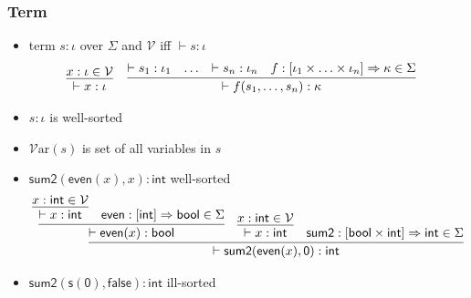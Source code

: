 \documentclass[12pt,aspectratio=169]{beamer}
\newcommand{\m}[1]{\mathsf{#1}}
\newcommand{\VV}{\mathcal{V}}
\newcommand{\TT}{\mathcal{T}}
\newcommand{\Var}{\mathcal{V}\mathrm{ar}}
\newcommand{\Terms}{\TT\mathrm{erms}}
\begin{document}
\begin{frame}
    \frametitle{Term}
    \begin{definition}[term]
        \begin{itemize}
        \item \alert{term} $s : \iota$ over $\Sigma$ and $\VV$ iff
        $\vdash s : \iota$ \pause
        \begin{align*}
            \infer{\vdash x : \iota}{x : \iota \in \VV} \;\;\;\;
                & \infer{\vdash f(s_1,\ldots, s_n) : \kappa}
                    {\vdash s_1 : \iota_1 & \ldots & \vdash s_n : \iota_n
                    & f:[\iota_1 \times \ldots \times \iota_n]
                    \Rightarrow \kappa \in \Sigma}
        \end{align*}
        \pause
        \item $s : \iota$ is \alert{well-sorted}
        \pause
        \item \alert{$\Var(s)$} is set of all variables in $s$
        \end{itemize}
    \end{definition}
\end{frame}


\begin{frame}
    \begin{example}
        \begin{itemize}
            \item $\m{sum2}(\m{even}(x), x) : \m{int}$ \pause \quad \alert{well-sorted}
            \pause
        {\small
            \begin{align*}
                \infer{\vdash \m{sum2}(\m{even}(x), \m{0}) : \m{int}}
                {\infer{\vdash \m{even}(x) : \m{bool}}
                    {\infer{\vdash x : \m{int}}{x : \m{int} \in \VV} & \m{even} : [\m{int}] \Rightarrow \m{bool} \in \Sigma}
                & \infer{\vdash x : \m{int}}{x : \m{int} \in \VV}
                & \m{sum2} : [\m{bool} \times \m{int}] \Rightarrow \m{int} \in \Sigma
                }
            \end{align*}
        }
        \pause
    \item $\m{sum2}(\m{s}(\m{0}), \m{false}) : \m{int}$ \pause \quad \alert{ill-sorted}
        \end{itemize}
    \end{example}
\end{frame}
\end{document}
